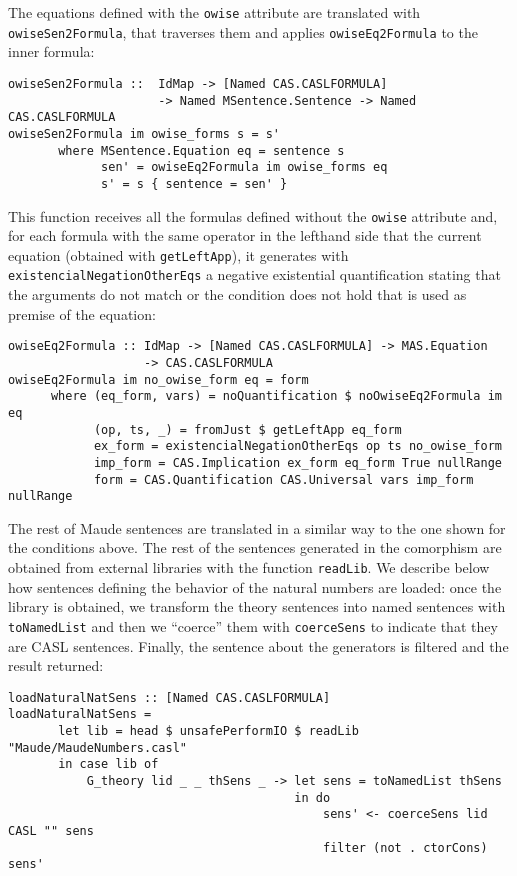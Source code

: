 The equations defined with the \verb"owise" attribute are translated
with \verb"owiseSen2Formula", that traverses them and applies
\verb"owiseEq2Formula" to the inner formula:

{\codesize
\begin{verbatim}
owiseSen2Formula ::  IdMap -> [Named CAS.CASLFORMULA] 
                     -> Named MSentence.Sentence -> Named CAS.CASLFORMULA
owiseSen2Formula im owise_forms s = s'
       where MSentence.Equation eq = sentence s
             sen' = owiseEq2Formula im owise_forms eq
             s' = s { sentence = sen' }
\end{verbatim}
}

This function receives all the formulas defined without the \verb"owise"
attribute and, for each formula with the same operator in the lefthand
side that the current equation (obtained with \verb"getLeftApp"), it
generates with \verb"existencialNegationOtherEqs" a negative existential
quantification stating that the arguments do not match or the condition
does not hold that is used as premise of the equation:

{\codesize
\begin{verbatim}
owiseEq2Formula :: IdMap -> [Named CAS.CASLFORMULA] -> MAS.Equation
                   -> CAS.CASLFORMULA
owiseEq2Formula im no_owise_form eq = form
      where (eq_form, vars) = noQuantification $ noOwiseEq2Formula im eq
            (op, ts, _) = fromJust $ getLeftApp eq_form
            ex_form = existencialNegationOtherEqs op ts no_owise_form
            imp_form = CAS.Implication ex_form eq_form True nullRange
            form = CAS.Quantification CAS.Universal vars imp_form nullRange
\end{verbatim}
}

The rest of Maude sentences are translated in a similar way to the one
shown for the conditions above.
The rest of the sentences generated in the comorphism are obtained
from external libraries with the function \verb"readLib". We describe
below how sentences defining the behavior of the natural numbers are
loaded: once the library is obtained, we transform the theory sentences
into named sentences with \verb"toNamedList" and then we ``coerce''
them with \verb"coerceSens" to indicate that they are CASL sentences.
Finally, the sentence about the generators is filtered and the result
returned:

{\codesize
\begin{verbatim}
loadNaturalNatSens :: [Named CAS.CASLFORMULA]
loadNaturalNatSens = 
       let lib = head $ unsafePerformIO $ readLib "Maude/MaudeNumbers.casl"
       in case lib of
           G_theory lid _ _ thSens _ -> let sens = toNamedList thSens
                                        in do
                                            sens' <- coerceSens lid CASL "" sens
                                            filter (not . ctorCons) sens'
\end{verbatim}
}

